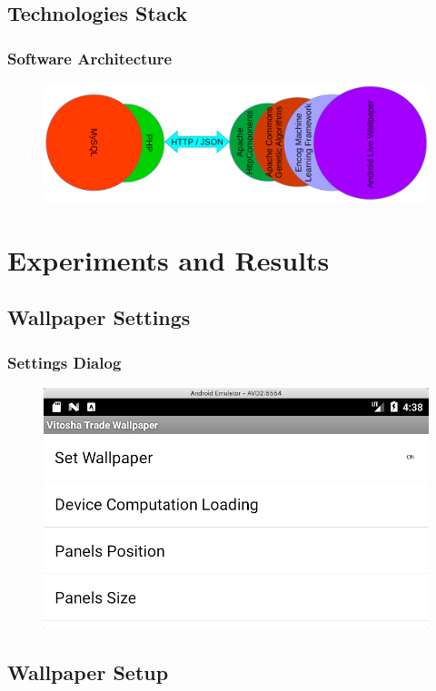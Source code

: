 \documentclass{beamer}
\begin{document}
\subsection{Technologies Stack}

\begin{frame}
\frametitle{Software Architecture}
\begin{figure}[h]
  \centering
  \includegraphics[width=0.75\linewidth]{fig01}
\label{fig:01}
\end{figure}
\end{frame}

\section{Experiments and Results}

\subsection{Wallpaper Settings}

\begin{frame}
\frametitle{Settings Dialog}
\begin{figure}[h]
  \centering
  \includegraphics[width=0.75\linewidth]{fig03}
\label{fig:03}
\end{figure}
\end{frame}

\subsection{Wallpaper Setup}
\end{document}
